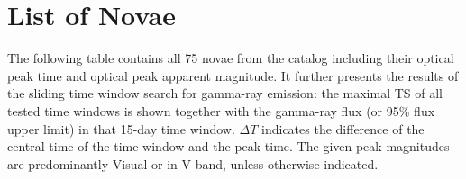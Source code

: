 \section{List of Novae}
\label{appendixA}
The following table contains all 75 novae from the catalog including their optical peak time and optical peak apparent magnitude. It further presents the results of the sliding time window search for gamma-ray emission: the maximal TS of all tested time windows is shown together with the gamma-ray flux (or 95\% flux upper limit) in that 15-day time window. $\Delta T$ indicates the difference of the central time of the time window and the peak time. The given peak magnitudes are predominantly Visual or in V-band, unless otherwise indicated.
\begin{landscape}
\begin{tiny}



\end{tiny}
\end{landscape}
